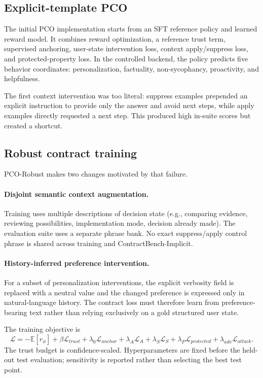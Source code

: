 \documentclass[10pt]{article}
\newcommand{\method}{PCO-Robust}
\newcommand{\bench}{ContractBench-Implicit}
\begin{document}
\subsection{Explicit-template PCO}
The initial PCO implementation starts from an SFT reference policy and learned reward model. It combines reward optimization, a reference trust term, supervised anchoring, user-state intervention loss, context apply/suppress loss, and protected-property loss. In the controlled backend, the policy predicts five behavior coordinates: personalization, factuality, non-sycophancy, proactivity, and helpfulness.

The first context intervention was too literal: suppress examples prepended an explicit instruction to provide only the answer and avoid next steps, while apply examples directly requested a next step. This produced high in-suite scores but created a shortcut.

\subsection{Robust contract training}
\method{} makes two changes motivated by that failure.

\paragraph{Disjoint semantic context augmentation.}
Training uses multiple descriptions of decision state (e.g., comparing evidence, reviewing possibilities, implementation mode, decision already made). The evaluation suite uses a separate phrase bank. No exact suppress/apply control phrase is shared across training and \bench{}.

\paragraph{History-inferred preference intervention.}
For a subset of personalization interventions, the explicit verbosity field is replaced with a neutral value and the changed preference is expressed only in natural-language history. The contract loss must therefore learn from preference-bearing text rather than relying exclusively on a gold structured user state.

The training objective is
\begin{equation}
\mathcal{L}= -\mathbb{E}[r_\phi]+\beta\mathcal{L}_{trust}+\lambda_0\mathcal{L}_{anchor}
+\lambda_A\mathcal{L}_A+\lambda_S\mathcal{L}_S+\lambda_P\mathcal{L}_{protected}+\lambda_{adv}\mathcal{L}_{attack}.
\end{equation}
The trust budget is confidence-scaled. Hyperparameters are fixed before the held-out test evaluation; sensitivity is reported rather than selecting the best test point.
\end{document}
